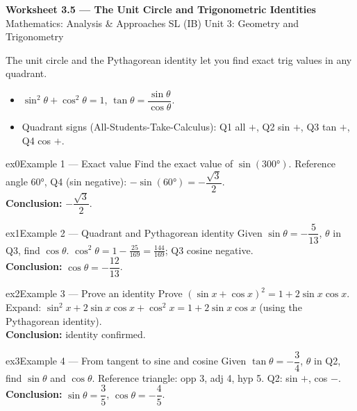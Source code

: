 \documentclass[11pt]{article}
\begin{document}
\begin{center}
{\LARGE\bfseries\color{titleblue}Worksheet 3.5 --- The Unit Circle and Trigonometric Identities}\\[2pt]
{\small Mathematics: Analysis \& Approaches SL (IB) \textperiodcentered{} Unit 3: Geometry and Trigonometry}
\end{center}

\begin{ideabox}
The unit circle and the Pythagorean identity let you find exact trig values in any quadrant.
\begin{itemize}[leftmargin=*,itemsep=2pt]
  \item $\sin^2\theta+\cos^2\theta=1$, $\tan\theta=\dfrac{\sin\theta}{\cos\theta}$.
  \item Quadrant signs (All-Students-Take-Calculus): Q1 all $+$, Q2 sin $+$, Q3 tan $+$, Q4 cos $+$.
\end{itemize}
\end{ideabox}


\begin{example}{ex0}{Example 1 --- Exact value}
Find the exact value of $\sin(300°)$.\soln
Reference angle $60°$, Q4 (sin negative): $-\sin(60°)=-\dfrac{\sqrt3}{2}$.\\[3pt]\textbf{Conclusion:} $-\dfrac{\sqrt3}2$.
\end{example}

\begin{example}{ex1}{Example 2 --- Quadrant and Pythagorean identity}
Given $\sin\theta=-\dfrac{5}{13}$, $\theta$ in Q3, find $\cos\theta$.\soln
$\cos^2\theta=1-\tfrac{25}{169}=\tfrac{144}{169}$; Q3 cosine negative.\\[3pt]\textbf{Conclusion:} $\cos\theta=-\dfrac{12}{13}$.
\end{example}

\begin{example}{ex2}{Example 3 --- Prove an identity}
Prove $(\sin x+\cos x)^2=1+2\sin x\cos x$.\soln
Expand: $\sin^2x+2\sin x\cos x+\cos^2x=1+2\sin x\cos x$ (using the Pythagorean identity).\\[3pt]\textbf{Conclusion:} identity confirmed.
\end{example}

\begin{example}{ex3}{Example 4 --- From tangent to sine and cosine}
Given $\tan\theta=-\dfrac34$, $\theta$ in Q2, find $\sin\theta$ and $\cos\theta$.\soln
Reference triangle: opp 3, adj 4, hyp 5. Q2: sin $+$, cos $-$.\\[3pt]\textbf{Conclusion:} $\sin\theta=\dfrac35$, $\cos\theta=-\dfrac45$.
\end{example}
\end{document}
